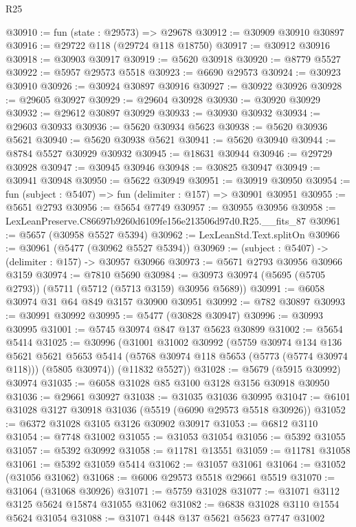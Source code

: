 \begin{lexlean}{R25}
\begin{coremodule}
@30910 := fun (state : @29573) => @29678
@30912 := @30909 @30910 @30897
@30916 := @29722 @118 (@29724 @118 @18750)
@30917 := @30912 @30916
@30918 := @30903 @30917
@30919 := @5620 @30918
@30920 := @8779 @5527
@30922 := @5957 @29573 @5518
@30923 := @6690 @29573
@30924 := @30923 @30910
@30926 := @30924 @30897 @30916
@30927 := @30922 @30926
@30928 := @29605 @30927
@30929 := @29604 @30928
@30930 := @30920 @30929
@30932 := @29612 @30897 @30929
@30933 := @30930 @30932
@30934 := @29603 @30933
@30936 := @5620 @30934 @5623
@30938 := @5620 @30936 @5621
@30940 := @5620 @30938 @5621
@30941 := @5620 @30940
@30944 := @8784 @5527 @30929 @30932
@30945 := @18631 @30944
@30946 := @29729 @30928
@30947 := @30945 @30946
@30948 := @30825 @30947
@30949 := @30941 @30948
@30950 := @5622 @30949
@30951 := @30919 @30950
@30954 := fun (subject : @5407) => fun (delimiter : @157) => @30901 @30951
@30955 := @5651 @2793
@30956 := @5654 @7749
@30957 := @30955 @30956
@30958 := LexLeanPreserve.C86697b9260d6109fe156e213506d97d0.R25.__fits_87
@30961 := @5657 (@30958 @5527 @5394)
@30962 := LexLeanStd.Text.splitOn
@30966 := @30961 (@5477 (@30962 @5527 @5394))
@30969 := (subject : @5407) -> (delimiter : @157) -> @30957 @30966
@30973 := @5671 @2793 @30956 @30966 @3159
@30974 := @7810 @5690
@30984 := @30973 @30974 (@5695 (@5705 @2793)) (@5711 (@5712 (@5713 @3159) @30956 @5689))
@30991 := @6058 @30974 @31 @64 @849 @3157 @30900 @30951
@30992 := @782 @30897
@30993 := @30991 @30992
@30995 := @5477 (@30828 @30947)
@30996 := @30993 @30995
@31001 := @5745 @30974 @847 @137 @5623 @30899
@31002 := @5654 @5414
@31025 := @30996
    (@31001
      @31002
      @30992
      (@5759
        @30974
        @134
        @136
        @5621
        @5621
        @5653
        @5414
        (@5768 @30974 @118 @5653 (@5773 (@5774 @30974 @118)))
        (@5805 @30974))
      (@11832 @5527))
@31028 := @5679 (@5915 @30992) @30974
@31035 := @6058 @31028 @85 @3100 @3128 @3156 @30918 @30950
@31036 := @29661 @30927
@31038 := @31035 @31036 @30995
@31047 := @6101 @31028 @3127 @30918 @31036 (@5519 (@6090 @29573 @5518 @30926))
@31052 := @6372 @31028 @3105 @3126 @30902 @30917
@31053 := @6812 @3110
@31054 := @7748 @31002
@31055 := @31053 @31054
@31056 := @5392 @31055
@31057 := @5392 @30992
@31058 := @11781 @13551
@31059 := @11781 @31058
@31061 := @5392 @31059 @5414
@31062 := @31057 @31061
@31064 := @31052 (@31056 @31062)
@31068 := @6006 @29573 @5518 @29661 @5519
@31070 := @31064 (@31068 @30926)
@31071 := @5759 @31028
@31077 := @31071 @3112 @3125 @5624 @15874 @31055 @31062
@31082 := @6838 @31028 @3110 @1554 @5624 @31054
@31088 := @31071 @448 @137 @5621 @5623 @7747 @31002

\end{coremodule}
\end{lexlean}
